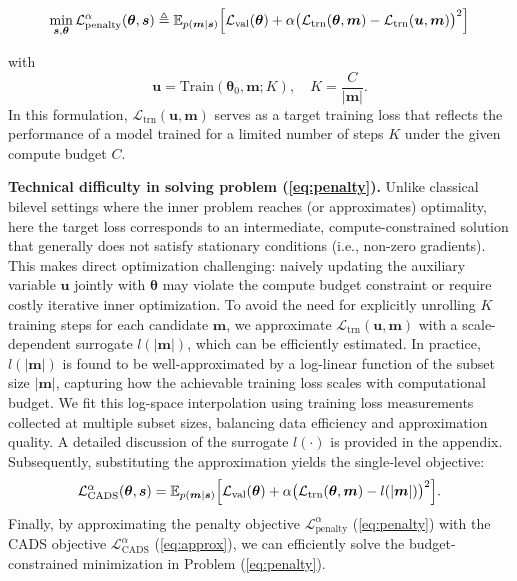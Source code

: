 \begin{equation}
\label{eq:penalty}
\min_{\bm{s},\bm{\theta}} \mathcal{L}^\alpha_{\mathrm{penalty}}(\bm{\theta},\bm{s})  \triangleq
\mathbb{E}_{p(\bm{m}\mid \bm{s})}
\Bigl[
  \mathcal{L}_{\mathrm{val}}(\bm{\theta})
  + \alpha\bigl(\mathcal{L}_{\mathrm{trn}}(\bm{\theta},\bm{m})
    - \mathcal{L}_{\mathrm{trn}}(\bm{u},\bm{m})\bigr)^{2}
\Bigr]
\end{equation}

with 
\[
\bm{u} = \mathrm{Train}(\bm{\theta}_{0},\bm{m};K), \quad K = \frac{C}{|\bm{m}|}.
\]  
In this formulation, \(\mathcal{L}_{\mathrm{trn}}(\bm{u},\bm{m})\) serves as a target training loss that reflects the performance of a model trained for a limited number of steps \(K\) under the given compute budget \(C\). 

\textbf{Technical difficulty in solving problem (\ref{eq:penalty}). } Unlike classical bilevel settings where the inner problem reaches (or approximates) optimality, here the target loss corresponds to an intermediate, compute-constrained solution that generally does not satisfy stationary conditions (i.e., non-zero gradients). 
This makes direct optimization challenging: naively updating the auxiliary variable \(\bm{u}\) jointly with \(\bm{\theta}\) may violate the compute budget constraint or require costly iterative inner optimization. To avoid the need for explicitly unrolling \(K\) training steps for each candidate \(\bm{m}\), we approximate \(\mathcal{L}_{\mathrm{trn}}(\bm{u},\bm{m})\) with a scale-dependent surrogate \(l(|\bm{m}|)\), which can be efficiently estimated.
In practice, \( l(|\bm{m}|) \) is found to be well-approximated by a log-linear function of the subset size \(|\bm{m}|\), capturing how the achievable training loss scales with computational budget. We fit this log-space interpolation using training loss measurements collected at multiple subset sizes, balancing data efficiency and approximation quality. A detailed discussion of the surrogate \( l(\cdot) \) is provided in the appendix.
Subsequently, substituting the approximation yields the single‑level objective:
\begin{equation}  
\label{eq:approx}  
\mathcal{L}^\alpha_{\text{CADS}}(\bm{\theta},\bm{s})=  
\mathbb{E}_{p(\bm{m}\mid \bm{s})}  
\Bigl[  
    \mathcal{L}_{\mathrm{val}}(\bm{\theta})  
    +\alpha\bigl(\mathcal{L}_{\mathrm{trn}}(\bm{\theta},\bm{m})-l(|\bm{m}|)\bigr)^{2}  
\Bigr].  
\end{equation}
Finally, by approximating the penalty objective $\mathcal{L}^\alpha_{\mathrm{penalty}}$ (\ref{eq:penalty}) with the CADS objective $\mathcal{L}^\alpha_{\mathrm{CADS}}$ (\ref{eq:approx}), we can efficiently solve the budget-constrained minimization in Problem (\ref{eq:penalty}).
